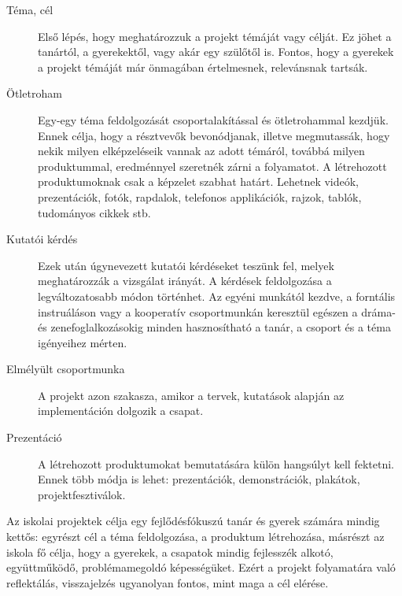 \begin{description}
      \item[Téma, cél] Első lépés, hogy meghatározzuk a projekt témáját vagy
            célját. Ez jöhet a tanártól, a gyerekektől, vagy akár egy szülőtől
            is.
            Fontos,
            hogy a gyerekek a projekt témáját már önmagában értelmesnek,
            relevánsnak
            tartsák.

      \item [Ötletroham]  Egy-egy téma feldolgozását csoportalakítással és
            ötletrohammal kezdjük. Ennek célja, hogy a résztvevők bevonódjanak,
            illetve
            megmutassák, hogy nekik milyen elképzeléseik vannak az adott
            témáról,
            továbbá
            milyen produktummal, eredménnyel szeretnék zárni a folyamatot. A
            létrehozott
            produktumoknak csak a képzelet szabhat határt. Lehetnek videók,
            prezentációk,
            fotók, rapdalok, telefonos applikációk, rajzok, tablók, tudományos
            cikkek stb.

      \item [Kutatói kérdés] Ezek után úgynevezett kutatói kérdéseket teszünk
            fel,
            melyek meghatározzák a vizsgálat irányát. A kérdések feldolgozása a
            legváltozatosabb módon történhet. Az egyéni munkától kezdve, a
            forntális
            instruáláson vagy a kooperatív csoportmunkán keresztül egészen a
            dráma-
            és
            zenefoglalkozásokig minden hasznosítható a tanár, a csoport és a
            téma
            igényeihez mérten.
      \item [Elmélyült csoportmunka] A projekt azon szakasza, amikor a tervek,
            kutatások alapján az implementáción dolgozik a csapat.
      \item [Prezentáció] A létrehozott produktumokat bemutatására külön
            hangsúlyt
            kell fektetni. Ennek több módja is lehet: prezentációk,
            demonstrációk,
            plakátok, projektfesztiválok.
\end{description}

Az iskolai projektek célja egy fejlődésfókuszú tanár és gyerek számára mindig
kettős: egyrészt cél a téma feldolgozása, a produktum létrehozása, másrészt az
iskola fő célja, hogy a gyerekek, a csapatok mindig fejlesszék alkotó,
együttműködő, problémamegoldó képességüket. Ezért a projekt folyamatára való
reflektálás, visszajelzés ugyanolyan fontos, mint maga a cél elérése.

